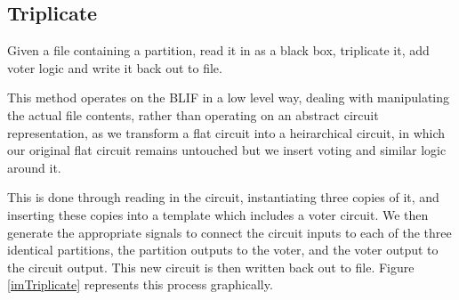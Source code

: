 \documentclass[12pt,final,oneside]{dwThesis} %
\begin{document}
\newpage

   \subsection{Triplicate}
   \label{algTriplicate} Given a file containing a
   partition, read it in as a black box, triplicate it, add voter logic and
   write it back out to file.

   This method operates on the \gls{BLIF} in a low level way, dealing with
   manipulating the actual file contents, rather than operating on an abstract
   circuit representation, as we transform a flat circuit into a heirarchical
   circuit, in which our original flat circuit remains untouched but we insert
   voting and similar logic around it.
   
   This is done through reading in the circuit, instantiating three copies of it,
   and inserting these copies into a template which includes a voter circuit.
   We then generate the appropriate signals to connect the circuit inputs to each of the three identical partitions, the partition outputs to the voter,
   and the voter output to the circuit output.
   This new circuit is then written back out to file.
   Figure \ref{imTriplicate} represents this process graphically.
\end{document}
